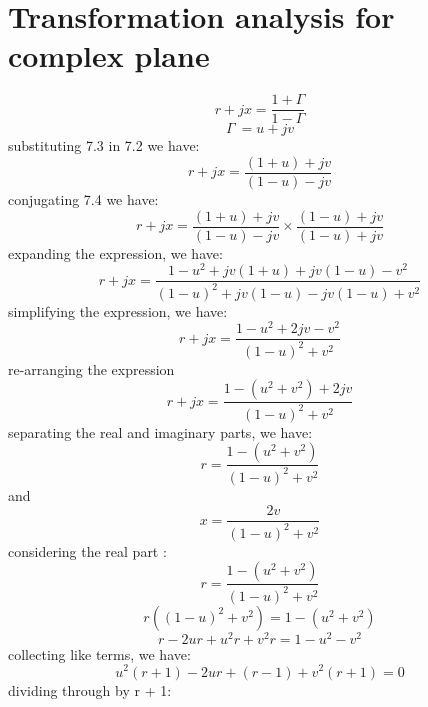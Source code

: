 \section{Transformation analysis for complex plane}
\begin{equation}
r + jx =\frac{1 + \Gamma}{1 - \Gamma}
\end{equation}
\begin{equation}
\Gamma\ = u + jv
\end{equation}
substituting 7.3 in 7.2 we have:
\begin{equation}
r + jx = \frac{(1 + u) + jv}{(1 - u) -jv}
\end{equation}
conjugating 7.4 we have:
\begin{equation*}
r + jx = \frac{(1 + u) + jv}{(1 - u) -jv}\times \frac{(1 - u) + jv}{(1 - u) +jv}
\end{equation*}
expanding the expression, we have:
\begin{equation*}
r + jx =\frac{1 - u^2 + jv(1 + u) + jv(1 - u) - v^2}{(1 - u)^2 + jv(1 - u) - jv(1 - u) + v^2} 
\end{equation*}
simplifying the expression, we have:
\begin{equation*}
r + jx = \frac{1 - u^2 + 2jv - v^2}{(1 -u)^2 + v^2}
\end{equation*}
re-arranging the expression
\begin{equation*}
r + jx = \frac{1 - (u^2 + v^2) + 2jv}{(1 - u)^2 + v^2}
\end{equation*}
separating the real and imaginary parts, we have:
\begin{equation}
r = \frac{1 - (u^2 + v^2)}{(1 - u)^2 + v^2}
\end{equation}
and
\begin{equation}
x = \frac{2v}{(1 - u)^2 + v^2}
\end{equation}
considering the real part :	
\begin{equation*}
r = \frac{1 - (u^2 + v^2)}{(1 - u)^2 + v^2}
\end{equation*}
\begin{equation*}
r((1 - u)^2 + v^2) = 1 -(u^2 + v^2)
\end{equation*}
\begin{equation*}
r - 2ur + u^2r + v^2r = 1 - u^2 - v^2
\end{equation*}
collecting like terms, we have:
\begin{equation*}
u^2(r + 1) -2ur + (r - 1) + v^2(r + 1) = 0
\end{equation*}
dividing through by r + 1:
